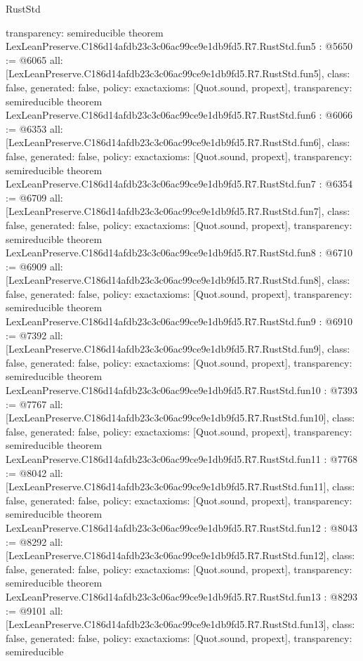 \begin{lexlean}{RustStd}
\begin{coremodule}
{  transparency: semireducible
}
theorem LexLeanPreserve.C186d14afdb23c3c06ac99ce9e1db9fd5.R7.RustStd.fun5 : @5650 := @6065 {
  all: [LexLeanPreserve.C186d14afdb23c3c06ac99ce9e1db9fd5.R7.RustStd.fun5],
  class: false,
  generated: false,
  policy: exact{axioms: [Quot.sound, propext]},
  transparency: semireducible
}
theorem LexLeanPreserve.C186d14afdb23c3c06ac99ce9e1db9fd5.R7.RustStd.fun6 : @6066 := @6353 {
  all: [LexLeanPreserve.C186d14afdb23c3c06ac99ce9e1db9fd5.R7.RustStd.fun6],
  class: false,
  generated: false,
  policy: exact{axioms: [Quot.sound, propext]},
  transparency: semireducible
}
theorem LexLeanPreserve.C186d14afdb23c3c06ac99ce9e1db9fd5.R7.RustStd.fun7 : @6354 := @6709 {
  all: [LexLeanPreserve.C186d14afdb23c3c06ac99ce9e1db9fd5.R7.RustStd.fun7],
  class: false,
  generated: false,
  policy: exact{axioms: [Quot.sound, propext]},
  transparency: semireducible
}
theorem LexLeanPreserve.C186d14afdb23c3c06ac99ce9e1db9fd5.R7.RustStd.fun8 : @6710 := @6909 {
  all: [LexLeanPreserve.C186d14afdb23c3c06ac99ce9e1db9fd5.R7.RustStd.fun8],
  class: false,
  generated: false,
  policy: exact{axioms: [Quot.sound, propext]},
  transparency: semireducible
}
theorem LexLeanPreserve.C186d14afdb23c3c06ac99ce9e1db9fd5.R7.RustStd.fun9 : @6910 := @7392 {
  all: [LexLeanPreserve.C186d14afdb23c3c06ac99ce9e1db9fd5.R7.RustStd.fun9],
  class: false,
  generated: false,
  policy: exact{axioms: [Quot.sound, propext]},
  transparency: semireducible
}
theorem LexLeanPreserve.C186d14afdb23c3c06ac99ce9e1db9fd5.R7.RustStd.fun10 : @7393 := @7767 {
  all: [LexLeanPreserve.C186d14afdb23c3c06ac99ce9e1db9fd5.R7.RustStd.fun10],
  class: false,
  generated: false,
  policy: exact{axioms: [Quot.sound, propext]},
  transparency: semireducible
}
theorem LexLeanPreserve.C186d14afdb23c3c06ac99ce9e1db9fd5.R7.RustStd.fun11 : @7768 := @8042 {
  all: [LexLeanPreserve.C186d14afdb23c3c06ac99ce9e1db9fd5.R7.RustStd.fun11],
  class: false,
  generated: false,
  policy: exact{axioms: [Quot.sound, propext]},
  transparency: semireducible
}
theorem LexLeanPreserve.C186d14afdb23c3c06ac99ce9e1db9fd5.R7.RustStd.fun12 : @8043 := @8292 {
  all: [LexLeanPreserve.C186d14afdb23c3c06ac99ce9e1db9fd5.R7.RustStd.fun12],
  class: false,
  generated: false,
  policy: exact{axioms: [Quot.sound, propext]},
  transparency: semireducible
}
theorem LexLeanPreserve.C186d14afdb23c3c06ac99ce9e1db9fd5.R7.RustStd.fun13 : @8293 := @9101 {
  all: [LexLeanPreserve.C186d14afdb23c3c06ac99ce9e1db9fd5.R7.RustStd.fun13],
  class: false,
  generated: false,
  policy: exact{axioms: [Quot.sound, propext]},
  transparency: semireducible
}
\end{coremodule}
\end{lexlean}

